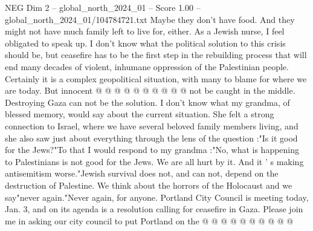 \begin{textsample}{NEG Dim 2 – global\_north\_2024\_01 – Score 1.00 – global\_north\_2024\_01/104784721.txt}
Maybe they don't have food.
And they might not have much family left to live for, either.
As a Jewish nurse, I feel obligated to speak up.
I don't know what the political solution to this crisis should be, but ceasefire has to be the first step in the rebuilding process that will end many decades of violent, inhumane oppression of the Palestinian people.
Certainly it is a complex geopolitical situation, with many to blame for where we are today.
But innocent @ @ @ @ @ @ @ @ @ @ not be caught in the middle.
Destroying Gaza can not be the solution.
I don't know what my grandma, of blessed memory, would say about the current situation.
She felt a strong connection to Israel, where we have several beloved family members living, and she also saw just about everything through the lens of the question :"Is it good for the Jews?"To that I would respond to my grandma :"No, what is happening to Palestinians is not good for the Jews.
We are all hurt by it.
And it ' s making antisemitism worse."Jewish survival does not, and can not, depend on the destruction of Palestine.
We think about the horrors of the Holocaust and we say"never again."Never again, for anyone.
Portland City Council is meeting today, Jan. 3, and on its agenda is a resolution calling for ceasefire in Gaza.
Please join me in asking our city council to put Portland on the @ @ @ @ @ @ @ @ @ @

\end{textsample}
